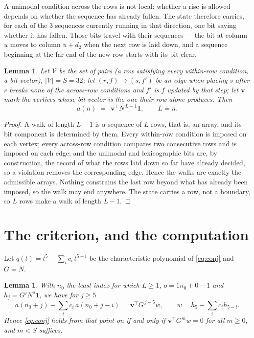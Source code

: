 \documentclass[11pt,a4paper]{article}
\theoremstyle{plain}
\newtheorem{lemma}[theorem]{Lemma}
\theoremstyle{definition}
\begin{document}
A unimodal condition across the rows is not local: whether a
rise is allowed depends on whether the sequence has already fallen. The state therefore
carries, for each of the $3$ sequences currently running in that direction, one bit saying
whether it has fallen. Those bits travel with their sequences --- the bit at column $u$
moves to column $u+d_2$ when the next row is laid down, and a sequence beginning at the
far end of the new row starts with its bit clear.

\begin{lemma}\label{lem:walk}
Let $\mathcal V$ be the set of pairs (a row satisfying every within-row condition, a
bit vector), $|\mathcal V|=S=32$; let $(r,f)\to(s,f')$ be an edge when placing $s$ after $r$
breaks none of the across-row conditions and $f'$ is $f$ updated by that step; let
$\mathbf{v}$ mark the vertices whose bit vector is the one their row alone produces.
Then
\[
a(n)\;=\;\,\mathbf{v}^{\!\top}N^{\,L-1}\mathbf{1},\qquad L=n.
\]
\end{lemma}

\begin{proof}
A walk of length $L-1$ is a sequence of $L$ rows, that is, an array, and its bit component
is determined by them. Every within-row condition is imposed on each vertex; every
across-row condition compares two consecutive rows and is imposed on each edge; and the
unimodal and lexicographic bits are, by construction, the record of what the rows laid down
so far have already decided, so a violation removes the corresponding edge. Hence the walks
are exactly the admissible arrays. Nothing constrains the last row beyond what has already
been imposed, so the walk may end anywhere. The state carries a row, not a boundary, so
$L$ rows make a walk of length $L-1$.
\end{proof}

\section{The criterion, and the computation}

Let $q(t)=t^{5}-\sum_i c_i\,t^{5-i}$ be the characteristic polynomial of
\eqref{eq:conj} and $G=N$.

\begin{lemma}\label{lem:crit}
With $n_0$ the least index for which $L\ge1$, $o=1n_0+0-1$ and
$h_j=G^{j}N^{o}\mathbf{1}$, we have for $j\ge5$
\[
a(n_0+j)-\sum_i c_i\,a(n_0+j-i)=\,\mathbf{v}^{\!\top}G^{\,j-5}w,
\qquad w=h_{5}-\sum_i c_ih_{5-i} .
\]
Hence \eqref{eq:conj} holds from that point on if and only if
$\mathbf{v}^{\!\top}G^{m}w=0$ for all $m\ge0$, and $m<S$ suffices.
\end{lemma}
\end{document}
